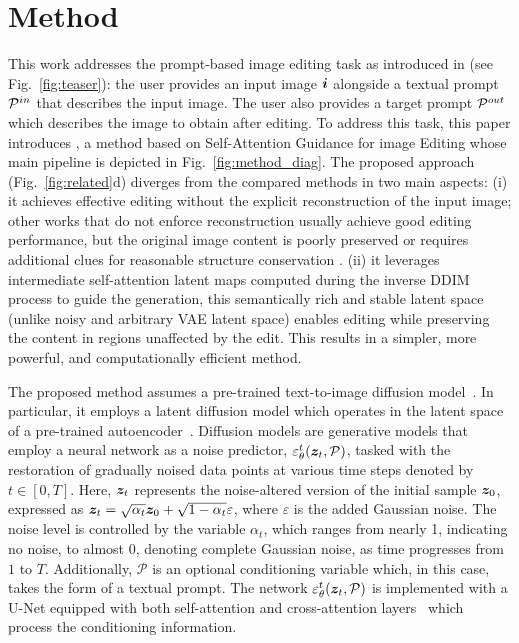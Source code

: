 \section{Method}
\label{sec:method}

{\modified{}This work addresses} the prompt-based image editing task as introduced in \cite{hertz2023prompt,mokady2023null} (see Fig.~\ref{fig:teaser}): the user provides an input image ${\bm{i}}$ alongside a textual prompt ${{\mathcal{P}}^{in}}$ that describes the input image. The user also provides a target prompt ${{\mathcal{P}}^{out}}$ which describes the image to obtain after editing.
To address this task, {\modified{}this paper introduces} \method, a method based on Self-Attention Guidance for image Editing whose main pipeline is depicted in Fig.~\ref{fig:method_diag}. 
{\modified{}The proposed approach} (Fig.~\ref{fig:related}d) diverges from the compared methods in two main aspects: (i) {\modified{}it achieves} effective editing without the explicit reconstruction of the input image; other works that do not enforce reconstruction usually achieve good editing performance, but the original image content is poorly preserved \cite{tumanyan2023plug} or {\modified{}requires} additional clues for reasonable structure conservation \cite{xu2023inversion}. (ii) {\modified{}it leverages} intermediate self-attention latent maps computed during the inverse DDIM process to guide the generation, this semantically rich and stable latent space (unlike noisy and arbitrary VAE latent space) enables editing while preserving the content in regions unaffected by the edit. This results in a simpler, more powerful, and computationally efficient method.


{\modified{}The proposed method assumes} a pre-trained text-to-image diffusion model~\cite{ho2020ddpm,saharia2022imagen}. In particular, {\modified{}it employs} a latent diffusion model which operates in the latent space of a pre-trained autoencoder~\cite{rombach2022latent}.
Diffusion models are generative models that employ a neural network as a noise predictor, $\varepsilon_\theta^t({\bm{z}}_t,\mathcal{P})$, tasked with the restoration of gradually noised data points at various time steps denoted by ${t \in[0,T]}$. Here, ${\bm{z}}_t$ represents the noise-altered version of the initial sample ${\bm{z}}_0$, expressed as ${\bm{z}}_t = \sqrt{\alpha_t} {\bm{z}}_0 + \sqrt{1-\alpha_t} \varepsilon$, where $\varepsilon$ is the added Gaussian noise. The noise level is controlled by the variable $\alpha_t$, which ranges from nearly 1, indicating no noise, to almost 0, denoting complete Gaussian noise, as time progresses from $1$ to $T$. Additionally, $\mathcal{P}$ is an optional conditioning variable which, in {\modified{}this} case, takes the form of a textual prompt.  The network $\varepsilon_\theta^t({\bm{z}}_t,\mathcal{P})$ is implemented with a U-Net equipped with both self-attention and cross-attention layers~\cite{vaswani2017attention} which process the conditioning information.


